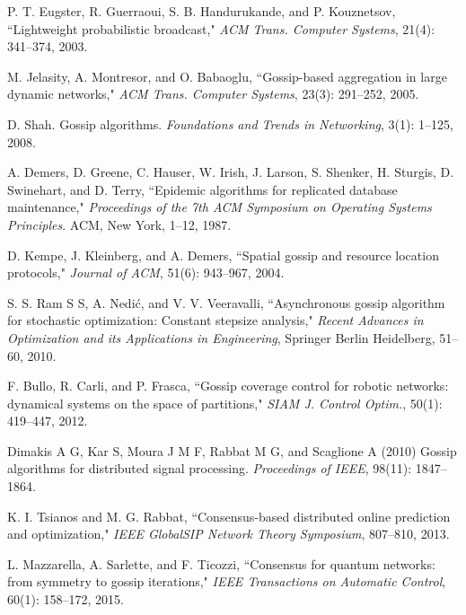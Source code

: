 \documentclass[a4paper, 11pt]{article}
\begin{document}
\begin{thebibliography}{99}




  P. T. Eugster, R.  Guerraoui, S. B.  Handurukande, and P.
 Kouznetsov, ``Lightweight probabilistic broadcast," {\em ACM Trans. Computer Systems}, 21(4): 341--374, 2003.

 M. Jelasity, A.  Montresor, and O. Babaoglu, ``Gossip-based aggregation in large
dynamic networks," {\em ACM Trans. Computer Systems}, 23(3): 291--252, 2005.

 D. Shah. Gossip algorithms. {\em Foundations and Trends in Networking}, 3(1): 1--125, 2008.



 A. Demers, D. Greene, C. Hauser, W. Irish, J. Larson, S. Shenker, H. Sturgis, D. Swinehart, and
D. Terry, ``Epidemic algorithms for replicated database maintenance," {\em Proceedings of the 7th
ACM Symposium on Operating Systems Principles}. ACM, New York, 1--12, 1987.


 D. Kempe, J. Kleinberg, and A. Demers, ``Spatial gossip and resource location protocols," {\em Journal of  ACM}, 51(6): 943--967, 2004.


 S. S. Ram S S, A. Nedi\'{c}, and V. V.  Veeravalli, ``Asynchronous gossip algorithm for stochastic optimization: Constant stepsize
analysis,"  {\em Recent Advances in Optimization and its Applications in Engineering}, Springer Berlin Heidelberg, 51--60, 2010.

    F. Bullo, R. Carli, and P. Frasca, ``Gossip coverage control for robotic networks: dynamical systems on the space of partitions," {\em SIAM J. Control Optim.}, 50(1): 419--447, 2012.

  Dimakis A G, Kar S,  Moura J M F,    Rabbat M G,   and   Scaglione A (2010) Gossip algorithms for distributed signal processing.  {\em Proceedings of IEEE}, 98(11):  1847--1864.


 K. I. Tsianos  and M. G. Rabbat, ``Consensus-based distributed online prediction and optimization," {\em  IEEE GlobalSIP Network Theory Symposium}, 807--810, 2013.


 L. Mazzarella, A. Sarlette, and F.  Ticozzi, ``Consensus for quantum networks:
from symmetry to gossip iterations," {\em IEEE Transactions on Automatic Control}, 60(1): 158--172, 2015.


\end{thebibliography}
\end{document}
